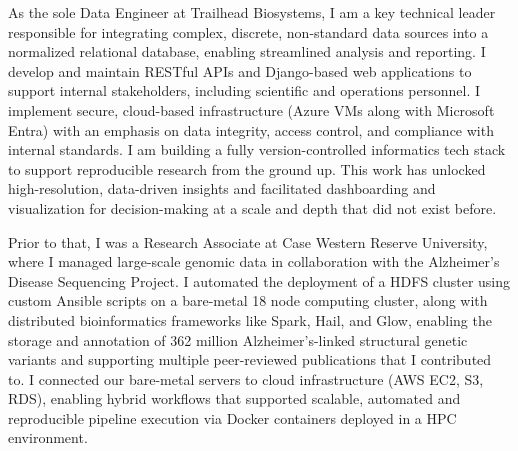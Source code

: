 


As the sole Data Engineer at Trailhead Biosystems, I am a key technical leader responsible for integrating complex, discrete, non-standard data sources into a normalized relational database, enabling streamlined analysis and reporting. I develop and maintain RESTful APIs and Django-based web applications to support internal stakeholders, including scientific and operations personnel. I implement secure, cloud-based infrastructure (Azure VMs along with Microsoft Entra) with an emphasis on data integrity, access control, and compliance with internal standards. I am building a fully version-controlled informatics tech stack to support reproducible research from the ground up. This work has unlocked high-resolution, data-driven insights and facilitated dashboarding and visualization for decision-making at a scale and depth that did not exist before.

Prior to that, I was a Research Associate at Case Western Reserve University, where I managed large-scale genomic data in collaboration with the Alzheimer’s Disease Sequencing Project. I automated the deployment of a HDFS cluster using custom Ansible scripts on a bare-metal 18 node computing cluster, along with distributed bioinformatics frameworks like Spark, Hail, and Glow, enabling the storage and annotation of 362 million Alzheimer’s-linked structural genetic variants and supporting multiple peer-reviewed publications that I contributed to. I connected our bare-metal servers to cloud infrastructure (AWS EC2, S3, RDS), enabling hybrid workflows that supported scalable, automated and reproducible pipeline execution via Docker containers deployed in a HPC environment. 
